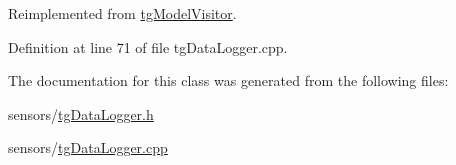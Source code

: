Reimplemented from \hyperlink{classtg_model_visitor_ac8567b6bbe2c62ddc44c11136502261b}{tg\-Model\-Visitor}.



Definition at line 71 of file tg\-Data\-Logger.\-cpp.



The documentation for this class was generated from the following files\-:\begin{DoxyCompactItemize}
\item 
sensors/\hyperlink{tg_data_logger_8h}{tg\-Data\-Logger.\-h}\item 
sensors/\hyperlink{tg_data_logger_8cpp}{tg\-Data\-Logger.\-cpp}\end{DoxyCompactItemize}
